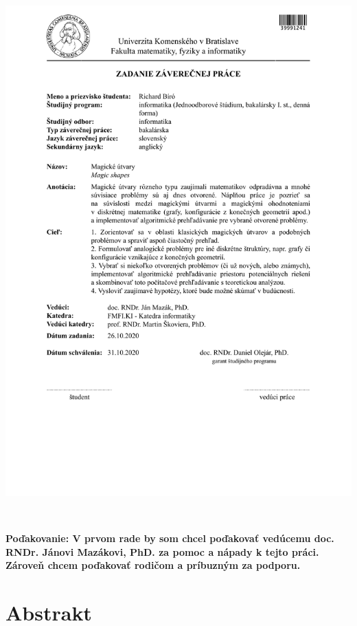 \documentclass[12pt, twoside]{book}
\begin{document}
\newpage 
\thispagestyle{empty}
\hspace{-2cm}\includegraphics[width=1.1\textwidth]{images/zadanie}


\frontmatter

\setcounter{page}{3}
\newpage 
~

\vfill
{\bf Poďakovanie: V prvom rade by som chcel poďakovať vedúcemu doc. RNDr. Jánovi Mazákovi, PhD. za pomoc a nápady k tejto práci. Zároveň chcem poďakovať rodičom a príbuzným za podporu. } 


\newpage 
\section*{Abstrakt}
\end{document}
